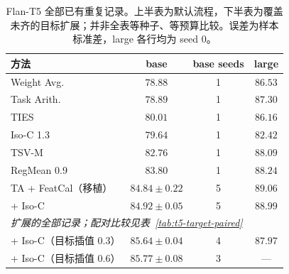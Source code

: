 \begin{table}[!htbp]
\centering\small
\caption{Flan-T5 全部已有重复记录。上半表为默认流程，下半表为覆盖未齐的目标扩展；并非全表等种子、等预算比较。误差为样本标准差，large 各行均为 seed 0。}
\label{tab:t5-main}
\begin{tabular}{@{}lccc@{}}
\toprule
方法 & base & base seeds & large \\
\midrule
Weight Avg. & $78.88$ & 1 & $86.53$ \\
Task Arith. & $78.89$ & 1 & $87.30$ \\
TIES & $80.01$ & 1 & $86.16$ \\
Iso-C 1.3 & $79.64$ & 1 & $82.42$ \\
TSV-M & $82.76$ & 1 & $88.09$ \\
RegMean 0.9 & $83.80$ & 1 & $88.24$ \\
TA + FeatCal（移植） & $84.84\pm 0.22$ & 5 & $89.06$ \\
\rowcolor{black!8}
\method{} + Iso-C & $84.92\pm 0.05$ & 5 & $88.99$ \\
\midrule
\multicolumn{4}{l}{\textit{扩展的全部记录；配对比较见表~\ref{tab:t5-target-paired}}} \\
\rowcolor{black!8}
\method{} + Iso-C（目标插值 0.3） & $85.64\pm 0.04$ & 4 & $87.97$ \\
\rowcolor{black!8}
\method{} + Iso-C（目标插值 0.6） & $85.77\pm 0.08$ & 3 & --- \\
\bottomrule
\end{tabular}
\end{table}

